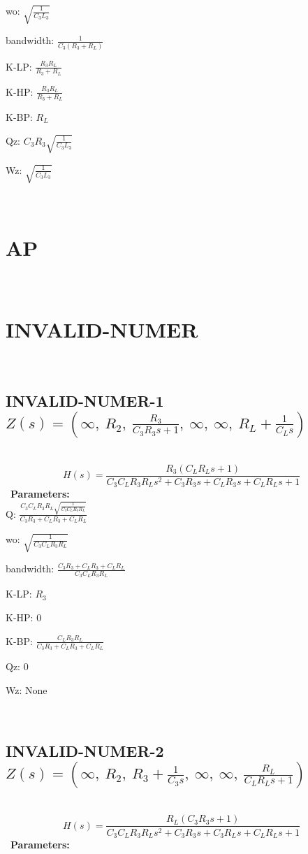 \documentclass{article}
\begin{document}
wo: $\sqrt{\frac{1}{C_{3} L_{3}}}$\ 

bandwidth: $\frac{1}{C_{3} \left(R_{3} + R_{L}\right)}$\ 

K-LP: $\frac{R_{3} R_{L}}{R_{3} + R_{L}}$\ 

K-HP: $\frac{R_{3} R_{L}}{R_{3} + R_{L}}$\ 

K-BP: $R_{L}$\ 

Qz: $C_{3} R_{3} \sqrt{\frac{1}{C_{3} L_{3}}}$\ 

Wz: $\sqrt{\frac{1}{C_{3} L_{3}}}$\ 

\ 

\section{AP}\ 
\section{INVALID-NUMER}\ 
\subsection{INVALID-NUMER-1 $Z(s) = \left( \infty, \  R_{2}, \  \frac{R_{3}}{C_{3} R_{3} s + 1}, \  \infty, \  \infty, \  R_{L} + \frac{1}{C_{L} s}\right)$ } \ 
\textbf{\[H(s) = \frac{R_{3} \left(C_{L} R_{L} s + 1\right)}{C_{3} C_{L} R_{3} R_{L} s^{2} + C_{3} R_{3} s + C_{L} R_{3} s + C_{L} R_{L} s + 1}\] } \ 
\textbf{Parameters:}\\ 

Q: $\frac{C_{3} C_{L} R_{3} R_{L} \sqrt{\frac{1}{C_{3} C_{L} R_{3} R_{L}}}}{C_{3} R_{3} + C_{L} R_{3} + C_{L} R_{L}}$\ 

wo: $\sqrt{\frac{1}{C_{3} C_{L} R_{3} R_{L}}}$\ 

bandwidth: $\frac{C_{3} R_{3} + C_{L} R_{3} + C_{L} R_{L}}{C_{3} C_{L} R_{3} R_{L}}$\ 

K-LP: $R_{3}$\ 

K-HP: $0$\ 

K-BP: $\frac{C_{L} R_{3} R_{L}}{C_{3} R_{3} + C_{L} R_{3} + C_{L} R_{L}}$\ 

Qz: $0$\ 

Wz: $\text{None}$\ 

\ 

\subsection{INVALID-NUMER-2 $Z(s) = \left( \infty, \  R_{2}, \  R_{3} + \frac{1}{C_{3} s}, \  \infty, \  \infty, \  \frac{R_{L}}{C_{L} R_{L} s + 1}\right)$ } \ 
\textbf{\[H(s) = \frac{R_{L} \left(C_{3} R_{3} s + 1\right)}{C_{3} C_{L} R_{3} R_{L} s^{2} + C_{3} R_{3} s + C_{3} R_{L} s + C_{L} R_{L} s + 1}\] } \ 
\textbf{Parameters:}\\ 
\end{document}
